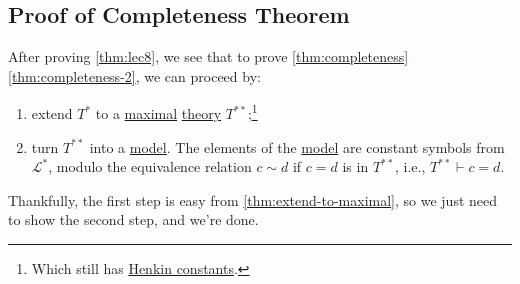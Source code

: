 \subsection{Proof of Completeness Theorem}
After proving \autoref{thm:lec8}, we see that to prove \autoref{thm:completeness} \autoref{thm:completeness-2}, we can proceed by:
\begin{enumerate}
	\item extend \(T^{\ast} \) to a \hyperref[def:maximal]{maximal} \hyperref[def:theory]{theory} \(T^{\ast\ast} \);\footnote{Which still has \hyperref[def:Henkin-constant]{Henkin constants}.}
	\item turn \(T^{\ast\ast} \) into a \hyperref[def:model]{model}. The elements of the \hyperref[def:model]{model} are constant symbols from \(\mathcal{L} ^{\ast} \), modulo the equivalence relation \(c \sim d\) if \(c=d\) is in \(T^{\ast\ast} \), i.e., \(T^{\ast\ast} \vdash c = d\).
\end{enumerate}

Thankfully, the first step is easy from \autoref{thm:extend-to-maximal}, so we just need to show the second step, and we're done.